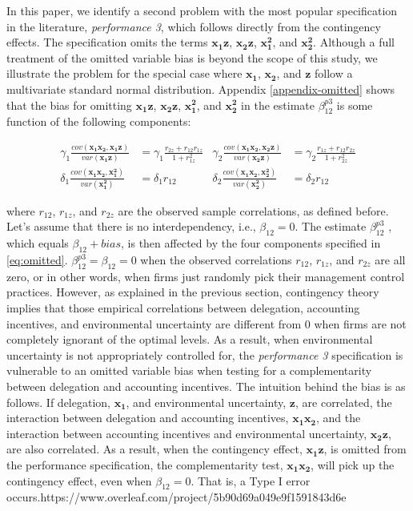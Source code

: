 \documentclass[12pt]{article}
\begin{document}
In this paper, we identify a second problem with the most popular specification in the literature, \emph{performance 3}, which follows directly from the contingency effects. The specification omits the terms $\mathbf{x_1 z}$, $\mathbf{x_2 z}$, $\mathbf{x_1^2}$, and $\mathbf{x_2^2}$. Although a full treatment of the omitted variable bias is beyond the scope of this study, we illustrate the problem for the special case where $\mathbf{x_1}$, $\mathbf{x_2}$, and $\mathbf{z}$ follow a multivariate standard normal distribution. Appendix \ref{appendix-omitted} shows that the bias for omitting $\mathbf{x_1 z}$, $\mathbf{x_2 z}$, $\mathbf{x_1^2}$, and $\mathbf{x_2^2}$ in the estimate $\beta^{p3}_{12}$ is some function of the following components:

\begin{equation}\label{eq:omitted}
\begin{aligned}
\gamma_1 \frac{cov(\mathbf{x_1 x_2}, \mathbf{x_1 z})}{var(\mathbf{x_1 z})} &= 
\gamma_1 \frac{r_{2z} + r_{12} r_{1z}}{1 + r_{1z}^2}
&\gamma_2 \frac{cov(\mathbf{x_1 x_2}, \mathbf{x_2 z})}{var(\mathbf{x_2 z})} &= 
\gamma_2 \frac{r_{1z} + r_{12} r_{2z}}{1 + r_{2z}^2}
\\
\delta_1 \frac{cov(\mathbf{x_1 x_2}, \mathbf{x_1^2})}{var(\mathbf{x_1^2})} &= 
\delta_1 r_{12}
&\delta_2 \frac{cov(\mathbf{x_1 x_2}, \mathbf{x_2^2})}{var(\mathbf{x_2^2})} &= 
\delta_2 r_{12}
\end{aligned}
\end{equation}

where $r_{12}$, $r_{1z}$, and $r_{2z}$ are the observed sample correlations, as defined before. Let's assume that there is no interdependency, i.e., $\beta_{12}=0$. The estimate $\beta^{p3}_{12}$ , which equals $\beta_{12} + bias$, is then affected by the four components specified in \eqref{eq:omitted}. $\beta^{p3}_{12}=\beta_{12}=0$ when the observed correlations $r_{12}$, $r_{1z}$, and $r_{2z}$ are all zero, or in other words, when firms just randomly pick their management control practices. However, as explained in the previous section, contingency theory implies that those empirical correlations between delegation, accounting incentives, and environmental uncertainty are different from $0$ when firms are not completely ignorant of the optimal levels. As a result, when environmental uncertainty is not appropriately controlled for, the \emph{performance 3} specification is vulnerable to an omitted variable bias when testing for a complementarity between delegation and accounting incentives. The intuition behind the bias is as follows. If delegation, $\mathbf{x_1}$, and environmental uncertainty, $\mathbf{z}$, are correlated, the interaction between delegation and accounting incentives, $\mathbf{x_1 x_2}$, and the interaction between accounting incentives and environmental uncertainty, $\mathbf{x_2 z}$, are also correlated. As a result, when the contingency effect, $\mathbf{x_1 z}$, is omitted from the performance specification, the complementarity test, $\mathbf{x_1 x_2}$, will pick up the contingency effect, even when $\beta_{12}=0$. That is, a Type I error occurs.https://www.overleaf.com/project/5b90d69a049e9f1591843d6e
\end{document}
